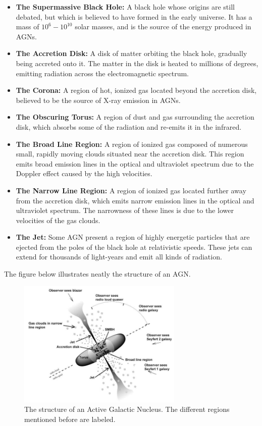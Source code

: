 \begin{itemize}
    \item \textbf{The Supermassive Black Hole:} A black hole whose origins are still debated, but which is believed to have formed in the early universe. It has a mass of $10^6 - 10^{10}$ solar masses, and is the source of the energy produced in AGNs.
    \item \textbf{The Accretion Disk:} A disk of matter orbiting the black hole, gradually being accreted onto it. The matter in the disk is heated to millions of degrees, emitting radiation across the electromagnetic spectrum.
    \item \textbf{The Corona:} A region of hot, ionized gas located beyond the accretion disk, believed to be the source of X-ray emission in AGNs.
    \item \textbf{The Obscuring Torus:} A region of dust and gas surrounding the accretion disk, which absorbs some of the radiation and re-emits it in the infrared.
    \item \textbf{The Broad Line Region:} A region of ionized gas composed of numerous small, rapidly moving clouds situated near the accretion disk. This region emits broad emission lines in the optical and ultraviolet spectrum due to the Doppler effect caused by the high velocities.
    \item \textbf{The Narrow Line Region:} A region of ionized gas located further away from the accretion disk, which emits narrow emission lines in the optical and ultraviolet spectrum. The narrowness of these lines is due to the lower velocities of the gas clouds.
    \item \textbf{The Jet:} Some AGN present a region of highly energetic particles that are ejected from the poles of the black hole at relativistic speeds. These jets can extend for thousands of light-years and emit all kinds of radiation.
\end{itemize}

The figure below illustrates neatly the structure of an AGN.

\begin{figure}[H]
    \centering
    \includegraphics[width=0.7\textwidth]{Figures/AGN Structure.jpg}
    \caption{The structure of an Active Galactic Nucleus. The different regions mentioned before are labeled.}
    \label{fig:AGN_structure}
\end{figure}


